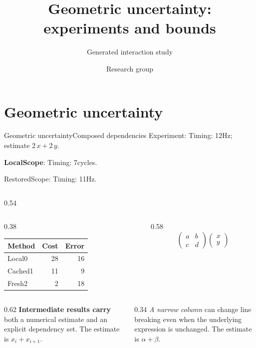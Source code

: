 \documentclass[9pt,aspectratio=43]{beamer}
\title{Geometric uncertainty: experiments and bounds}
\subtitle{Generated interaction study}
\author{Research group}
\date{}
\newcommand{\fuzzlayerA}[1]{\textrm{#1}}
\newcommand{\fuzzlayerB}[1]{\fuzzlayerA{#1}}
\newcommand{\fuzzlayerC}[1]{\fuzzlayerB{#1}}
\newcommand{\fuzzterm}[1]{\fuzzlayerC{#1}}
\newcommand{\fuzzpair}[2]{\fuzzterm{#1}: #2}
\newcommand{\fuzzunit}{Hz}
\newcommand{\fuzzcoefficient}{2}
\newcommand{\fuzzscale}[2][\fuzzcoefficient]{#1\,#2}
\begin{document}
\section{Geometric uncertainty}
\begin{frame}[t,shrink=5]{Geometric uncertainty}{Composed dependencies}
\fuzzpair{Experiment}{Timing: 12\fuzzunit; estimate $\fuzzscale{x}+\fuzzscale[2]{y}$.}\par
{\renewcommand{\fuzzunit}{cycles}\let\fuzzterm\textbf\fuzzpair{LocalScope}{Timing: 7\fuzzunit.}\par}
\fuzzpair{RestoredScope}{Timing: 11\fuzzunit.}\par
\begin{columns}[onlytextwidth,c]
\begin{column}{0.54\textwidth}
\begin{description}
\item<1->[Stage 1] \begin{columns}[onlytextwidth,t]
\begin{column}{0.38\textwidth}
\begin{tabular}{lrr}Method&Cost&Error\\\hline
Local0&28&16\\
Cached1&11&9\\
Fresh2&2&18\\
\end{tabular}
\end{column}
\begin{column}{0.58\textwidth}
\[\begin{pmatrix}a&b\\c&d\end{pmatrix}\begin{pmatrix}x\\y\end{pmatrix}\]
\end{column}
\end{columns}
\item<2->[Stage 2] \begin{columns}[onlytextwidth,b]
\begin{column}{0.62\textwidth}
\textbf{Intermediate results carry} both a numerical estimate and an explicit dependency set.  The estimate is $x_i+x_{i+1}$.
\end{column}
\begin{column}{0.34\textwidth}
\textit{A narrow column} can change line breaking even when the underlying expression is unchanged.  The estimate is $\alpha+\beta$.
\end{column}

\end{columns}
\end{description}
\end{column}
\end{columns}
\end{frame}
\end{document}
